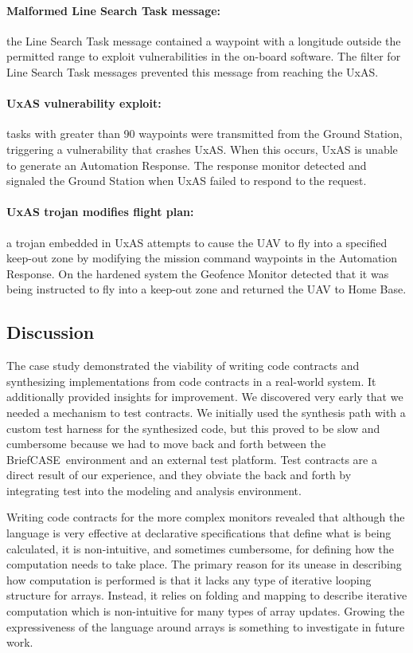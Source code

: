\documentclass[global,twocolumn]{svjour}
\newcommand{\brfcs}{BriefCASE}
\begin{document}
\paragraph{Malformed Line Search Task message:\/}
%
the Line Search Task message contained a waypoint with a longitude outside the permitted range to exploit vulnerabilities in the on-board software.
%
The filter for Line Search Task messages prevented this message from reaching the UxAS.

\paragraph{UxAS vulnerability exploit:\/} tasks with greater than 90 waypoints were transmitted from the Ground Station, triggering a vulnerability that crashes UxAS.
%
When this occurs, UxAS is unable to generate an Automation Response.
%
The response monitor detected and signaled the Ground Station when UxAS failed to respond to the request.

\paragraph{UxAS trojan modifies flight plan:\/} a trojan embedded in UxAS attempts to cause the UAV to fly into a specified keep-out zone by modifying the mission command waypoints in the Automation Response.
%
On the hardened system the Geofence Monitor detected that it was being instructed to fly into a keep-out zone and returned the UAV to Home Base.


\subsection{Discussion}

The case study demonstrated the viability of writing code contracts and synthesizing implementations from code contracts in a real-world system.
%
It additionally provided insights for improvement.
%
We discovered very early that we needed a mechanism to test contracts.
%
We initially used the synthesis path with a custom test harness for the synthesized code, but this proved to be slow and cumbersome because we had to move back and forth between the \brfcs\ environment and an external test platform.
%
Test contracts are a direct result of our experience, and they obviate the back and forth by integrating test into the modeling and analysis environment.

Writing code contracts for the more complex monitors revealed that although the language is very effective at declarative specifications that define what is being calculated, it is non-intuitive, and sometimes cumbersome, for defining how the computation needs to take place.
%
The primary reason for its unease in describing how computation is performed is that it lacks any type of iterative looping structure for arrays.
%
Instead, it relies on folding and mapping to describe iterative computation which is non-intuitive for many types of array updates.
%
Growing the expressiveness of the language around arrays is something to investigate in future work.
\end{document}
